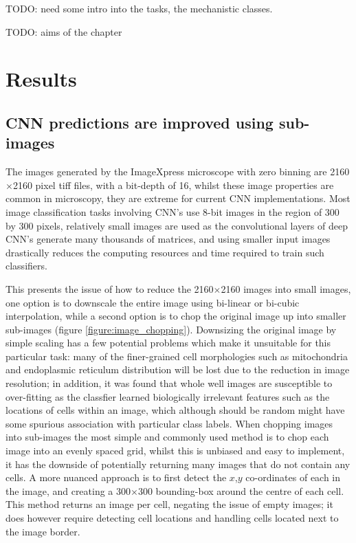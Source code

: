 \documentclass[a4paper,11pt,twoside,openright]{scrbook}
\begin{document}
TODO: need some intro into the tasks, the mechanistic classes.

TODO: aims of the chapter

\section{Results}

\subsection{CNN predictions are improved using sub-images}

The images generated by the ImageXpress microscope with zero binning are 2160$\times$2160 pixel tiff files, with a bit-depth of 16, whilst these image properties are common in microscopy, they are extreme for current CNN implementations.
Most image classification tasks involving CNN's use 8-bit images in the region of 300 by 300 pixels, relatively small images are used as the convolutional layers of deep CNN's generate many thousands of matrices, and using smaller input images drastically reduces the computing resources and time required to train such classifiers.

This presents the issue of how to reduce the 2160$\times$2160 images into small images, one option is to downscale the entire image using bi-linear or bi-cubic interpolation, while a second option is to chop the original image up into smaller sub-images (figure \ref{figure:image_chopping}).
Downsizing the original image by simple scaling has a few potential problems which make it unsuitable for this particular task:
    many of the finer-grained cell morphologies such as mitochondria and endoplasmic reticulum distribution will be lost due to the reduction in image resolution;
    in addition, it was found that whole well images are susceptible to over-fitting as the classfier learned biologically irrelevant features such as the locations of cells within an image, which although should be random might have some spurious association with particular class labels.
When chopping images into sub-images the most simple and commonly used method is to chop each image into an evenly spaced grid, whilst this is unbiased and easy to implement, it has the downside of potentially returning many images that do not contain any cells.
A more nuanced approach is to first detect the $x$,$y$ co-ordinates of each  in the image, and creating a 300$\times$300 bounding-box around the centre of each cell.
This method returns an image per cell, negating the issue of empty images; it does however require detecting cell locations and handling cells located next to the image border.
\end{document}
